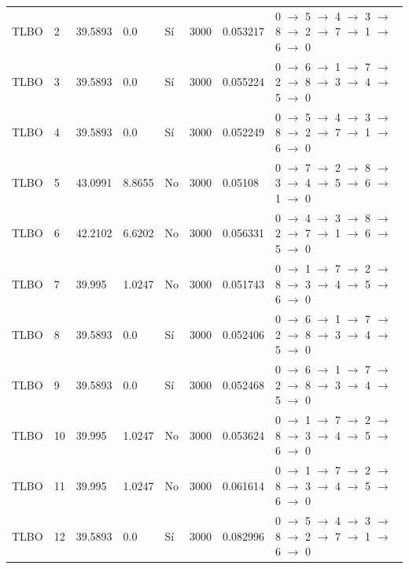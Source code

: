 \begin{table}[htbp]
\begin{tabular}{llllllll}
    TLBO & 2 & 39.5893 & 0.0 & Sí & 3000 & 0.053217 & 0 $\rightarrow$ 5 $\rightarrow$ 4 $\rightarrow$ 3 $\rightarrow$ 8 $\rightarrow$ 2 $\rightarrow$ 7 $\rightarrow$ 1 $\rightarrow$ 6 $\rightarrow$ 0 \\
    TLBO & 3 & 39.5893 & 0.0 & Sí & 3000 & 0.055224 & 0 $\rightarrow$ 6 $\rightarrow$ 1 $\rightarrow$ 7 $\rightarrow$ 2 $\rightarrow$ 8 $\rightarrow$ 3 $\rightarrow$ 4 $\rightarrow$ 5 $\rightarrow$ 0 \\
    TLBO & 4 & 39.5893 & 0.0 & Sí & 3000 & 0.052249 & 0 $\rightarrow$ 5 $\rightarrow$ 4 $\rightarrow$ 3 $\rightarrow$ 8 $\rightarrow$ 2 $\rightarrow$ 7 $\rightarrow$ 1 $\rightarrow$ 6 $\rightarrow$ 0 \\
    TLBO & 5 & 43.0991 & 8.8655 & No & 3000 & 0.05108 & 0 $\rightarrow$ 7 $\rightarrow$ 2 $\rightarrow$ 8 $\rightarrow$ 3 $\rightarrow$ 4 $\rightarrow$ 5 $\rightarrow$ 6 $\rightarrow$ 1 $\rightarrow$ 0 \\
    TLBO & 6 & 42.2102 & 6.6202 & No & 3000 & 0.056331 & 0 $\rightarrow$ 4 $\rightarrow$ 3 $\rightarrow$ 8 $\rightarrow$ 2 $\rightarrow$ 7 $\rightarrow$ 1 $\rightarrow$ 6 $\rightarrow$ 5 $\rightarrow$ 0 \\
    TLBO & 7 & 39.995 & 1.0247 & No & 3000 & 0.051743 & 0 $\rightarrow$ 1 $\rightarrow$ 7 $\rightarrow$ 2 $\rightarrow$ 8 $\rightarrow$ 3 $\rightarrow$ 4 $\rightarrow$ 5 $\rightarrow$ 6 $\rightarrow$ 0 \\
    TLBO & 8 & 39.5893 & 0.0 & Sí & 3000 & 0.052406 & 0 $\rightarrow$ 6 $\rightarrow$ 1 $\rightarrow$ 7 $\rightarrow$ 2 $\rightarrow$ 8 $\rightarrow$ 3 $\rightarrow$ 4 $\rightarrow$ 5 $\rightarrow$ 0 \\
    TLBO & 9 & 39.5893 & 0.0 & Sí & 3000 & 0.052468 & 0 $\rightarrow$ 6 $\rightarrow$ 1 $\rightarrow$ 7 $\rightarrow$ 2 $\rightarrow$ 8 $\rightarrow$ 3 $\rightarrow$ 4 $\rightarrow$ 5 $\rightarrow$ 0 \\
    TLBO & 10 & 39.995 & 1.0247 & No & 3000 & 0.053624 & 0 $\rightarrow$ 1 $\rightarrow$ 7 $\rightarrow$ 2 $\rightarrow$ 8 $\rightarrow$ 3 $\rightarrow$ 4 $\rightarrow$ 5 $\rightarrow$ 6 $\rightarrow$ 0 \\
    TLBO & 11 & 39.995 & 1.0247 & No & 3000 & 0.061614 & 0 $\rightarrow$ 1 $\rightarrow$ 7 $\rightarrow$ 2 $\rightarrow$ 8 $\rightarrow$ 3 $\rightarrow$ 4 $\rightarrow$ 5 $\rightarrow$ 6 $\rightarrow$ 0 \\
    TLBO & 12 & 39.5893 & 0.0 & Sí & 3000 & 0.082996 & 0 $\rightarrow$ 5 $\rightarrow$ 4 $\rightarrow$ 3 $\rightarrow$ 8 $\rightarrow$ 2 $\rightarrow$ 7 $\rightarrow$ 1 $\rightarrow$ 6 $\rightarrow$ 0 \\

\end{tabular}
\end{table}
